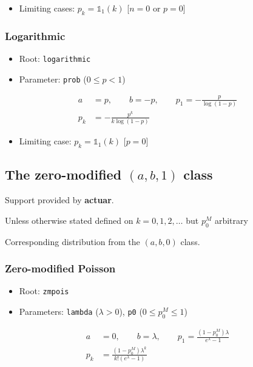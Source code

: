 \documentclass[x11names]{article}
\newcommand{\pkg}[1]{\textbf{#1}}
\newcommand{\code}[1]{\texttt{#1}}
\begin{document}
\begin{itemize}
\item Limiting cases: $p_k = \mathbb{1}_1(k)$ [$n = 0$ or $p = 0$]
\end{itemize}

\subsubsection{Logarithmic}

\begin{itemize}
\item Root: \code{logarithmic}
\item Parameter: \code{prob} ($0 \leq p < 1$)
\end{itemize}
\begin{align*}
  a &= p, \qquad b = -p, \qquad
      p_1 = - \frac{p}{\log (1 - p)} \\
  p_k &= - \frac{p^k}{k \log (1 - p)}
\end{align*}

\begin{itemize}
\item Limiting case: $p_k = \mathbb{1}_1(k)$ [$p = 0$]
\end{itemize}




\subsection[The zero-modified (a, b, 0) class]{The zero-modified $(a, b, 1)$ class}
\label{sec:app:discrete:zm}

Support provided by \pkg{actuar}.

Unless otherwise stated defined on $k = 0, 1, 2, \dots$ but $p_0^M$ arbitrary

Corresponding distribution from the $(a, b, 0)$ class.

\subsubsection{Zero-modified Poisson}

\begin{itemize}
\item Root: \code{zmpois}
\item Parameters: \code{lambda} ($\lambda > 0$),
  \code{p0} ($0 \leq p_0^M \leq 1$)
\end{itemize}
\begin{align*}
  a &= 0, \qquad b = \lambda, \qquad
      p_1 = \frac{(1 - p_0^M) \lambda}{e^\lambda - 1} \\
  p_k &= \frac{(1 - p_0^M) \lambda^k}{k! (e^\lambda - 1)}
\end{align*}
\end{document}
